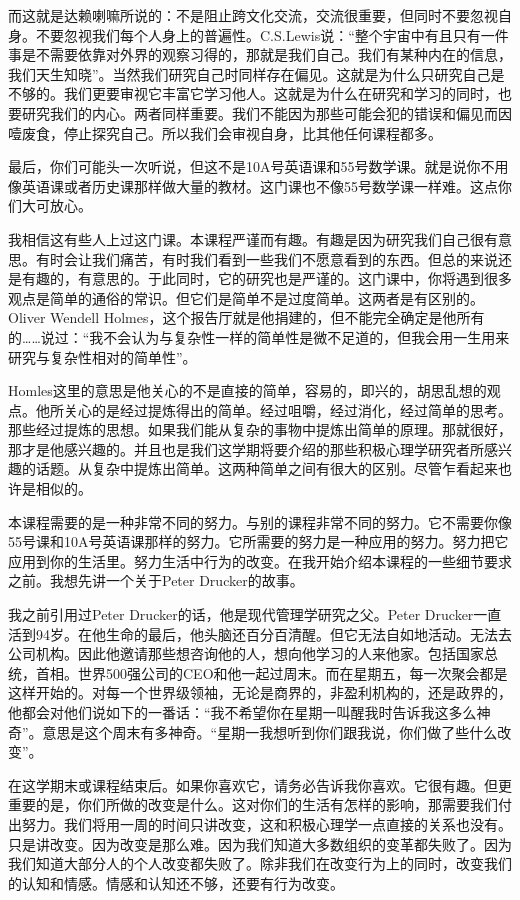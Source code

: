 而这就是达赖喇嘛所说的：不是阻止跨文化交流，交流很重要，但同时不要忽视自身。不要忽视我们每个人身上的普遍性。C.S.Lewis说：“整个宇宙中有且只有一件事是不需要依靠对外界的观察习得的，那就是我们自己。我们有某种内在的信息，我们天生知晓”。当然我们研究自己时同样存在偏见。这就是为什么只研究自己是不够的。我们更要审视它丰富它学习他人。这就是为什么在研究和学习的同时，也要研究我们的内心。两者同样重要。我们不能因为那些可能会犯的错误和偏见而因噎废食，停止探究自己。所以我们会审视自身，比其他任何课程都多。 

最后，你们可能头一次听说，但这不是10A号英语课和55号数学课。就是说你不用像英语课或者历史课那样做大量的教材。这门课也不像55号数学课一样难。这点你们大可放心。

我相信这有些人上过这门课。本课程严谨而有趣。有趣是因为研究我们自己很有意思。有时会让我们痛苦，有时我们看到一些我们不愿意看到的东西。但总的来说还是有趣的，有意思的。于此同时，它的研究也是严谨的。这门课中，你将遇到很多观点是简单的通俗的常识。但它们是简单不是过度简单。这两者是有区别的。Oliver Wendell Holmes，这个报告厅就是他捐建的，但不能完全确定是他所有的……说过：“我不会认为与复杂性一样的简单性是微不足道的，但我会用一生用来研究与复杂性相对的简单性”。

Homles这里的意思是他关心的不是直接的简单，容易的，即兴的，胡思乱想的观点。他所关心的是经过提炼得出的简单。经过咀嚼，经过消化，经过简单的思考。那些经过提炼的思想。如果我们能从复杂的事物中提炼出简单的原理。那就很好，那才是他感兴趣的。并且也是我们这学期将要介绍的那些积极心理学研究者所感兴趣的话题。从复杂中提炼出简单。这两种简单之间有很大的区别。尽管乍看起来也许是相似的。

本课程需要的是一种非常不同的努力。与别的课程非常不同的努力。它不需要你像55号课和10A号英语课那样的努力。它所需要的努力是一种应用的努力。努力把它应用到你的生活里。努力生活中行为的改变。在我开始介绍本课程的一些细节要求之前。我想先讲一个关于Peter Drucker的故事。

我之前引用过Peter Drucker的话，他是现代管理学研究之父。Peter Drucker一直活到94岁。在他生命的最后，他头脑还百分百清醒。但它无法自如地活动。无法去公司机构。因此他邀请那些想咨询他的人，想向他学习的人来他家。包括国家总统，首相。世界500强公司的CEO和他一起过周末。而在星期五，每一次聚会都是这样开始的。对每一个世界级领袖，无论是商界的，非盈利机构的，还是政界的，他都会对他们说如下的一番话：“我不希望你在星期一叫醒我时告诉我这多么神奇”。意思是这个周末有多神奇。“星期一我想听到你们跟我说，你们做了些什么改变”。

在这学期末或课程结束后。如果你喜欢它，请务必告诉我你喜欢。它很有趣。但更重要的是，你们所做的改变是什么。这对你们的生活有怎样的影响，那需要我们付出努力。我们将用一周的时间只讲改变，这和积极心理学一点直接的关系也没有。只是讲改变。因为改变是那么难。因为我们知道大多数组织的变革都失败了。因为我们知道大部分人的个人改变都失败了。除非我们在改变行为上的同时，改变我们的认知和情感。情感和认知还不够，还要有行为改变。

